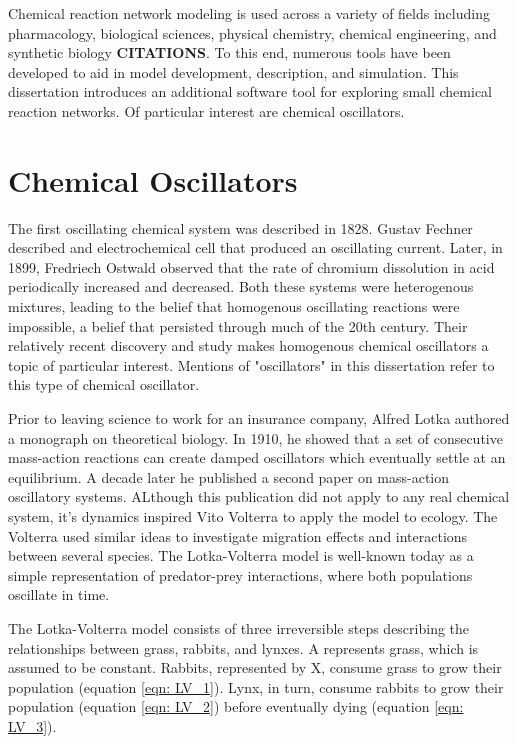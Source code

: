 \documentclass[12pt]{report}
\begin{document}
Chemical reaction network modeling is used across a variety of fields including pharmacology, biological sciences, physical chemistry, chemical engineering, and synthetic biology \textbf{CITATIONS}. To this end, numerous tools have been developed to aid in model development, description, and simulation. This dissertation introduces an additional software tool for exploring small chemical reaction networks. Of particular interest are chemical oscillators.


\section{Chemical Oscillators}
The first oscillating chemical system was described in 1828. Gustav Fechner described and electrochemical cell that produced an oscillating current. Later, in 1899, Fredriech Ostwald observed that the rate of chromium dissolution in acid periodically increased and decreased. Both these systems were heterogenous mixtures, leading to the belief that homogenous oscillating reactions were impossible, a belief that persisted through much of the 20th century. Their relatively recent discovery and study makes homogenous chemical oscillators a topic of particular interest. Mentions of "oscillators" in this dissertation refer to this type of chemical oscillator.

Prior to leaving science to work for an insurance company, Alfred Lotka authored a monograph on theoretical biology. In 1910, he showed that a set of consecutive mass-action reactions can create damped oscillators which eventually settle at an equilibrium. A decade later he published a second paper on mass-action oscillatory systems. ALthough this publication did not apply to any real chemical system, it's dynamics inspired Vito Volterra to apply the model to ecology. The Volterra used similar ideas to investigate migration effects and interactions between several species. The Lotka-Volterra model is well-known today as a simple representation of predator-prey interactions, where both populations oscillate in time.

The Lotka-Volterra model consists of three irreversible steps describing the relationships between grass, rabbits, and lynxes. A represents grass, which is assumed to be constant. Rabbits, represented by X, consume grass to grow their population (equation \ref{eqn: LV_1}). Lynx, in turn, consume rabbits to grow their population (equation \ref{eqn: LV_2}) before eventually dying (equation \ref{eqn: LV_3}).
\end{document}
